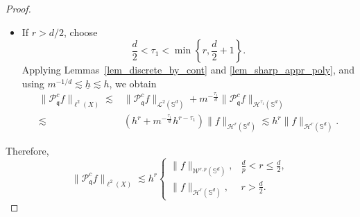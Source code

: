 \documentclass{article}
\numberwithin{equation}{section}
\def\SS{\mathbb{S}}
\def\pc{\mathcal{P}^c}
\def\mq{\mathfrak{q}}
\begin{document}
\begin{proof}
\begin{itemize}
\begin{equation*}
\begin{split}
    \end{split}
\end{equation*}
    \item If $r>d/2$, choose
    \begin{equation*}
        \frac d2<\tau_1<\min\left\{r,\frac d2+1\right\}.
    \end{equation*}
    Applying Lemmas~\ref{lem_discrete_by_cont} and \ref{lem_sharp_appr_poly}, and using $m^{-1/d}\lesssim\underline h\lesssim h$, we obtain
    \begin{equation*}
        \begin{split}
            \|\pc_\mq f\|_{\ell^2(X)}
            \lesssim&\|\pc_\mq f\|_{\mathcal L^2(\SS^d)}
            +m^{-\frac{\tau_1}{d}}\|\pc_\mq f\|_{\mathcal H^{\tau_1}(\SS^d)}\\
            \lesssim&\left(h^r+m^{-\frac{\tau_1}{d}}h^{r-\tau_1}\right)
            \|f\|_{\mathcal H^r(\SS^d)}
            \lesssim h^r\|f\|_{\mathcal H^r(\SS^d)}.
        \end{split}
    \end{equation*}
\end{itemize}
Therefore,
\begin{equation}\label{eqn_poincare1}
    \|\pc_\mq f\|_{\ell^2(X)}
    \lesssim h^r
    \left\{\begin{array}{ll}
        \|f\|_{\mathcal W^{r,p}(\SS^d)},&\frac{d}{p}<r\leq\frac d2,\\[0.3em]
        \|f\|_{\mathcal H^r(\SS^d)},&r>\frac d2.
    \end{array}\right.
\end{equation}


\end{proof}
\end{document}
